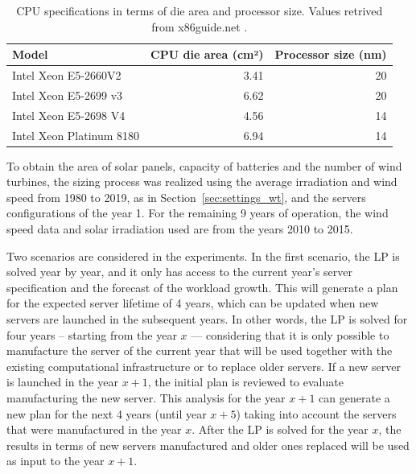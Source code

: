 \begin{table}[h]
  \small
  \caption{CPU specifications in terms of die area and processor size. Values retrived from x86guide.net \cite{ref_xeon_e5_2660v2,ref_xeon_e5_2698v4,ref_xeon_e5_2699v3,ref_xeon_platinum_8180}.} \centering
  \label{tab:cpu_specs} 
  \begin{tabular}{|l|r|r|}
   \hline

  \textbf{Model}  & \textbf{CPU die area (cm²)} & \textbf{Processor size (nm) } \\
    \hline
    Intel Xeon E5-2660V2 & 3.41  & 20  \\
    \hline
    Intel Xeon E5-2699 v3& 6.62  & 20  \\
    \hline
    Intel Xeon E5-2698 V4 & 4.56 & 14\\
    \hline
    Intel Xeon Platinum 8180 & 6.94 & 14\\
  \hline
\end{tabular}  
\end{table}



To obtain the area of solar panels, capacity of batteries and the number of wind turbines, the sizing process was realized using the average irradiation and wind speed from 1980 to 2019, as in Section~\ref{sec:settings_wt}, and the servers configurations of the year 1. For the remaining 9 years of operation, the wind speed data and solar irradiation used are from the years 2010 to 2015.

Two scenarios are considered in the experiments. In the first scenario, the LP is solved year by year, and it only has access to the current year's server specification and the forecast of the workload growth. This will generate a plan for the expected server lifetime of 4 years, which can be updated when new servers are launched in the subsequent years. In other words, the LP is solved for four years -- starting from the year $x$ --- considering that it is only possible to manufacture the server of the current year that will be used together with the existing computational infrastructure or to replace older servers. If a new server is launched in the year $x + 1$, the initial plan is reviewed to evaluate manufacturing the new server. This analysis for the year $x+1$ can generate a new plan for the next 4 years (until year $x+5$) taking into account the servers that were manufactured in the year $x$. After the LP is solved for the year $x$, the results in terms of new servers manufactured and older ones replaced will be used as input to the year $x +1$.

